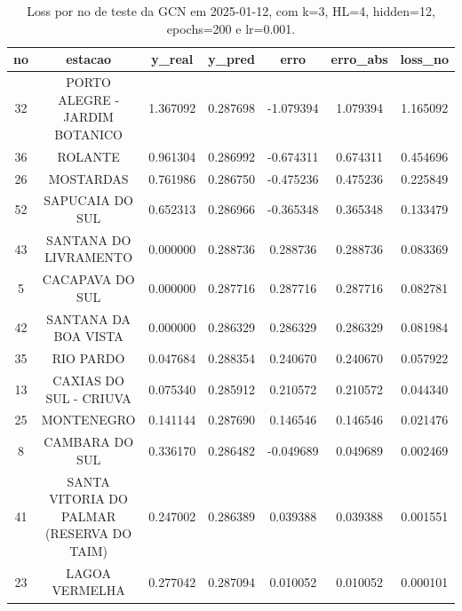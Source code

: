 \begin{table}[h]
\centering
\caption{Loss por no de teste da GCN em 2025-01-12, com k=3, HL=4, hidden=12, epochs=200 e lr=0.001.}
\label{tab:gcn_loss_k3_hl4_h12_e200_d20250112}
\begin{tabular}{ccccccc}
\toprule
no & estacao & y\_real & y\_pred & erro & erro\_abs & loss\_no \\
\midrule
32 & PORTO ALEGRE - JARDIM BOTANICO & 1.367092 & 0.287698 & -1.079394 & 1.079394 & 1.165092 \\
36 & ROLANTE & 0.961304 & 0.286992 & -0.674311 & 0.674311 & 0.454696 \\
26 & MOSTARDAS & 0.761986 & 0.286750 & -0.475236 & 0.475236 & 0.225849 \\
52 & SAPUCAIA DO SUL & 0.652313 & 0.286966 & -0.365348 & 0.365348 & 0.133479 \\
43 & SANTANA DO LIVRAMENTO & 0.000000 & 0.288736 & 0.288736 & 0.288736 & 0.083369 \\
5 & CACAPAVA DO SUL & 0.000000 & 0.287716 & 0.287716 & 0.287716 & 0.082781 \\
42 & SANTANA DA BOA VISTA & 0.000000 & 0.286329 & 0.286329 & 0.286329 & 0.081984 \\
35 & RIO PARDO & 0.047684 & 0.288354 & 0.240670 & 0.240670 & 0.057922 \\
13 & CAXIAS DO SUL - CRIUVA & 0.075340 & 0.285912 & 0.210572 & 0.210572 & 0.044340 \\
25 & MONTENEGRO & 0.141144 & 0.287690 & 0.146546 & 0.146546 & 0.021476 \\
8 & CAMBARA DO SUL & 0.336170 & 0.286482 & -0.049689 & 0.049689 & 0.002469 \\
41 & SANTA VITORIA DO PALMAR (RESERVA DO TAIM) & 0.247002 & 0.286389 & 0.039388 & 0.039388 & 0.001551 \\
23 & LAGOA VERMELHA & 0.277042 & 0.287094 & 0.010052 & 0.010052 & 0.000101 \\
\bottomrule
\end{tabular}
\end{table}
